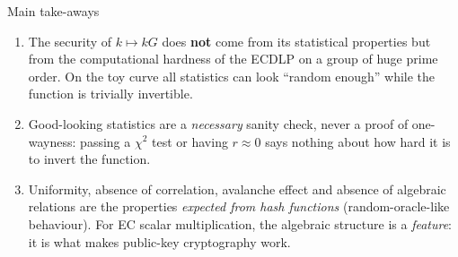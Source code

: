 \begin{framedobs}{Main take-aways}
  \begin{enumerate}
    \item The security of $k \mapsto kG$ does \textbf{not} come from its statistical properties but from the computational hardness of the ECDLP on a group of huge prime order. On the toy curve all statistics can look ``random enough'' while the function is trivially invertible.
    \item Good-looking statistics are a \textit{necessary} sanity check, never a proof of one-wayness: passing a $\chi^2$ test or having $r \approx 0$ says nothing about how hard it is to invert the function.
    \item Uniformity, absence of correlation, avalanche effect and absence of algebraic relations are the properties \textit{expected from hash functions} (random-oracle-like behaviour). For EC scalar multiplication, the algebraic structure is a \textit{feature}: it is what makes public-key cryptography work.
  \end{enumerate}
\end{framedobs}
